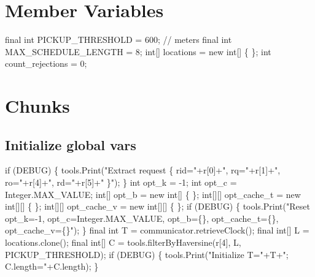 \section{Member Variables}
\nwenddocs{}\endmoddef\nwstartdeflinemarkup{}\nwenddeflinemarkup
final int PICKUP_THRESHOLD = 600;  // meters
final int MAX_SCHEDULE_LENGTH = 8;
int[] locations = new int[] \{ \};
int count_rejections = 0;
\nwendcode{}\nwdocspar

\section{Chunks}

\subsection{Initialize global vars}
\nwenddocs{}\endmoddef\nwstartdeflinemarkup{}\nwenddeflinemarkup
if (DEBUG) \{
  tools.Print("Extract request \{ rid="+r[0]+", rq="+r[1]+", ro="+r[4]+", rd="+r[5]+" \}");
\}
int     opt_k       = -1;
int     opt_c       = Integer.MAX_VALUE;
int[]   opt_b       = new int[] \{ \};
int[][] opt_cache_t = new int[][] \{ \};
int[][] opt_cache_v = new int[][] \{ \};
if (DEBUG) \{
  tools.Print("Reset opt_k=-1, opt_c=Integer.MAX_VALUE, opt_b=\{\}, opt_cache_t=\{\}, opt_cache_v=\{\}");
\}
final int   T = communicator.retrieveClock();
final int[] L = locations.clone();
final int[] C = tools.filterByHaversine(r[4], L, PICKUP_THRESHOLD);
if (DEBUG) \{
  tools.Print("Initialize T="+T+"; C.length="+C.length);
\}
\nwendcode{}\nwdocspar

